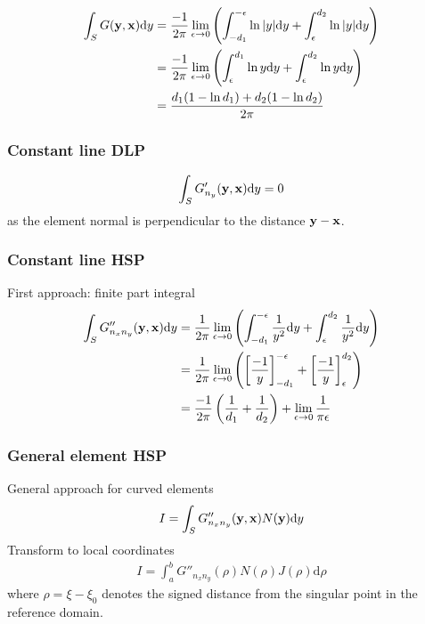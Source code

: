 \documentclass[a4paper,11pt]{article}
\newcommand{\td}{\mathrm{d}}
\begin{document}
\begin{align}
\int_{S} G({\bf y}, {\bf x}) \td y
& = \frac{-1}{2\pi}\lim_{\epsilon \to 0}
\left( \int_{-d_1}^{-\epsilon} \ln |y| \td y + \int_{\epsilon}^{d_2}  \ln |y| \td y \right) \nonumber \\
& = \frac{-1}{2\pi}\lim_{\epsilon \to 0}
\left( \int_{\epsilon}^{d_1} \ln y \td y + \int_{\epsilon}^{d_2}  \ln y \td y \right) \nonumber \\
&=
\frac{d_1(1-\ln d_1) + d_2(1-\ln d_2)}{2\pi}
\end{align}

\subsubsection{Constant line DLP}

\begin{equation}
\int_{S} G'_{n_y}({\bf y}, {\bf x}) \td y = 0
\end{equation}
%
as the element normal is perpendicular to the distance ${\bf y}-{\bf x}$.

\subsubsection{Constant line HSP}

First approach: finite part integral
%
\begin{align}
\int_{S} G''_{n_x n_y}({\bf y}, {\bf x}) \td y
&= \frac{1}{2\pi} \lim_{\epsilon \to 0} \left(\int_{-d_1}^{-\epsilon} \frac{1}{y^2}\td y + \int_{\epsilon}^{d_2} \frac{1}{y^2} \td y\right) \nonumber \\
&= \frac{1}{2\pi} \lim_{\epsilon \to 0} \left(\left[\frac{-1}{y}\right]_{-d_1}^{-\epsilon} +  \left[\frac{-1}{y}\right]_{\epsilon}^{d_2} \right)
\nonumber \\
&= \frac{-1}{2\pi} \left(\frac{1}{d_1} +  \frac{1}{d_2} \right) + \lim_{\epsilon \to 0} \frac{1}{\pi\epsilon}
\end{align}

\subsubsection{General element HSP}

General approach for curved elements
%
\begin{align}
	I = \int_S G''_{n_x n_y}({\bf y}, {\bf x}) N({\bf y}) \td y
\end{align}
%
Transform to local coordinates
\begin{align}
	I = \int_a^b G''_{n_x n_y}(\rho) N(\rho) J(\rho) \td \rho
\end{align}
%
where $\rho = \xi - \xi_0$ denotes the signed distance from the singular point in the reference domain.
\end{document}
